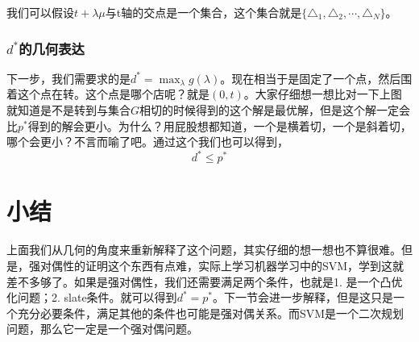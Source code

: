 \documentclass[a4paper]{article}
\begin{document}
我们可以假设$t+\lambda \mu$与t轴的交点是一个集合，这个集合就是$\{\triangle_1,\triangle_2,\cdots,\triangle_N\}$。

\subsubsection{$d^\ast$的几何表达}
下一步，我们需要求的是$d^\ast = \max_{\lambda} g(\lambda)$。现在相当于是固定了一个点，然后围着这个点在转。这个点是哪个店呢？就是$(0,t)$。大家仔细想一想比对一下上图就知道是不是转到与集合$G$相切的时候得到的这个解是最优解，但是这个解一定会比$p^\ast$得到的解会更小。为什么？用屁股想都知道，一个是横着切，一个是斜着切，哪个会更小？不言而喻了吧。通过这个我们也可以得到，
\begin{equation}
    d^\ast \leq p^\ast
\end{equation}

\section{小结}
上面我们从几何的角度来重新解释了这个问题，其实仔细的想一想也不算很难。但是，强对偶性的证明这个东西有点难，实际上学习机器学习中的SVM，学到这就差不多够了。如果是强对偶性，我们还需要满足两个条件，也就是1. 是一个凸优化问题；2. slate条件。就可以得到$d^\ast = p^\ast$。下一节会进一步解释，但是这只是一个充分必要条件，满足其他的条件也可能是强对偶关系。而SVM是一个二次规划问题，那么它一定是一个强对偶问题。
\end{document}
